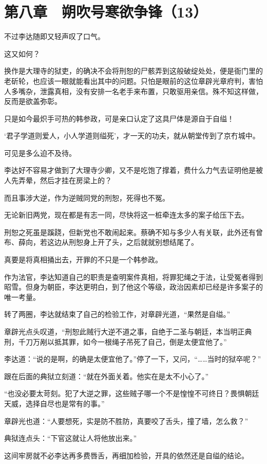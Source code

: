 \section{第八章　朔吹号寒欲争锋（13）}

不过李达随即又轻声叹了口气。

这又如何？

换作是大理寺的狱吏，的确决不会将刑恕的尸骸弄到这般破绽处处，便是衙门里的老斫轮，也应该一眼就能看出其中的问题。只怕是眼前的这位章辟光章府判，害怕人多嘴杂，泄露真相，没有安排一名老手来布置，只敢驱用亲信。殊不知这样做，反而是欲盖弥彰。

只是如今最炽手可热的韩参政，可是亲口认定了这具尸体是源自于自缢！

‘君子学道则爱人，小人学道则缢死’，才一天的功夫，就从朝堂传到了京冇城中。

可见是多么迫不及待。

李达好不容易才做到了大理寺少卿，又不是吃饱了撑着，费什么力气去证明他是被人先弄晕，然后才挂在房梁上的？

而且事涉大逆，作为逆贼同党的刑恕，死得也不冤。

无论新旧两党，现在都是有志一同，尽快将这一桩牵连太多的案子给压下去。

刑恕之死虽是蹊跷，但新党也不敢闹起来。蔡确不知与多少人有关联，此外还有曾布、薛向，若这边从刑恕身上开了头，之后就就别想结尾了。

真要是将真相捅出去，开罪的不只是一个韩参政。

作为法官，李达知道自己的职责是查明案件真相，将罪犯绳之于法，让受冤者得到昭雪。但身为朝臣，李达更明白，到了他这个等级，政治因素却已经是许多案子的唯一考量。

转了两圈，李达就结束了自己的检验工作，对章辟光道，“果然是自缢。”

章辟光点头叹道，“刑恕此贼行大逆不道之事，自绝于二圣与朝廷，本当明正典刑，千刀万剐以抵其罪，如今一根绳子吊死了自己，倒是太便宜他了。”

李达道：“说的是啊，的确是太便宜他了。”停了一下，又问，“……当时的狱卒呢？”

跟在后面的典狱立刻道：“就在外面关着。他实在是太不小心了。”

“也没必要太苛刻。犯了大逆之罪，这些贼子哪一个不是惶惶不可终日？畏惧朝廷天威，选择自尽也是常有的事。”

章辟光也道：“人要想死，实是防不胜防，真要咬了舌头，撞了墙，怎么救？”

典狱连点头：“下官这就让人将他放出来。”

这间牢房就不必李达再多费唇舌，再细加检验，开具的依然还是自缢的结论。

